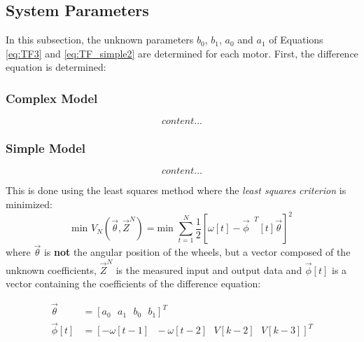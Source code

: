 \documentclass[a4paper,kul]{kulakarticle} %
\begin{document}

\subsection{System Parameters}
\label{subsec:lse}

In this subsection, the unknown parameters $b_0$, $b_1$, $a_0$ and $a_1$ of Equations \ref{eq:TF3} and \ref{eq:TF_simple2} are determined for each motor. First, the difference equation is determined: 
\subsubsection*{Complex Model}
\begin{equation}
	content...
\end{equation}

\subsubsection*{Simple Model}
\begin{equation}
content...
\end{equation}



This is done using the least squares method where the \textit{least squares criterion} is minimized: 
\begin{equation}
	\text{min } V_N (\vec{\theta}, \vec{Z}^N) = \text{min }\sum_{t = 1}^{N}\frac{1}{2} \left[\omega[t] - \vec{\phi}^{\text{ }T}[t]\vec{\theta}\right]^2
\end{equation}
where $\vec{\theta}$ is \textbf{not} the angular position of the wheels, but a vector composed of the unknown coefficients, $\vec{Z}^N$ is the measured input and output data and $\vec{\phi}[t]$ is a vector containing the coefficients of the difference equation:

\begin{equation}
	\begin{split}
	\vec{\theta} &= \left[a_0\text{ }a_1\text{ }b_0\text{ }b_1\right]^T \\
	\vec{\phi}[t] &= \left[-\omega[t-1]\text{ }-\omega[t-2]\text{ }V[k-2]\text{ }V[k-3]\right]^T
	\end{split}
\end{equation}



\end{document}
